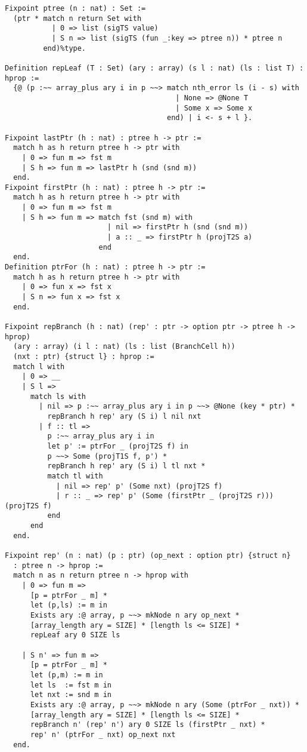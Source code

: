 \documentclass{article}
\begin{document}
\begin{lstlisting}
Fixpoint ptree (n : nat) : Set :=
  (ptr * match n return Set with
           | 0 => list (sigTS value)
           | S n => list (sigTS (fun _:key => ptree n)) * ptree n
         end)%type.

Definition repLeaf (T : Set) (ary : array) (s l : nat) (ls : list T) : hprop :=
  {@ (p :~~ array_plus ary i in p ~~> match nth_error ls (i - s) with
                                        | None => @None T
                                        | Some x => Some x
                                      end) | i <- s + l }.
  
Fixpoint lastPtr (h : nat) : ptree h -> ptr :=
  match h as h return ptree h -> ptr with
    | 0 => fun m => fst m
    | S h => fun m => lastPtr h (snd (snd m))
  end.
Fixpoint firstPtr (h : nat) : ptree h -> ptr :=
  match h as h return ptree h -> ptr with
    | 0 => fun m => fst m
    | S h => fun m => match fst (snd m) with
                        | nil => firstPtr h (snd (snd m))
                        | a :: _ => firstPtr h (projT2S a)
                      end
  end.
Definition ptrFor (h : nat) : ptree h -> ptr :=
  match h as h return ptree h -> ptr with
    | 0 => fun x => fst x
    | S n => fun x => fst x
  end.

Fixpoint repBranch (h : nat) (rep' : ptr -> option ptr -> ptree h -> hprop) 
  (ary : array) (i l : nat) (ls : list (BranchCell h))
  (nxt : ptr) {struct l} : hprop :=
  match l with
    | 0 => __
    | S l => 
      match ls with
        | nil => p :~~ array_plus ary i in p ~~> @None (key * ptr) * 
          repBranch h rep' ary (S i) l nil nxt
        | f :: tl =>
          p :~~ array_plus ary i in
          let p' := ptrFor _ (projT2S f) in
          p ~~> Some (projT1S f, p') *
          repBranch h rep' ary (S i) l tl nxt *
          match tl with
            | nil => rep' p' (Some nxt) (projT2S f)
            | r :: _ => rep' p' (Some (firstPtr _ (projT2S r))) (projT2S f)
          end
      end
  end.

Fixpoint rep' (n : nat) (p : ptr) (op_next : option ptr) {struct n}
  : ptree n -> hprop :=
  match n as n return ptree n -> hprop with 
    | 0 => fun m =>
      [p = ptrFor _ m] *
      let (p,ls) := m in
      Exists ary :@ array, p ~~> mkNode n ary op_next *
      [array_length ary = SIZE] * [length ls <= SIZE] *
      repLeaf ary 0 SIZE ls
        
    | S n' => fun m =>
      [p = ptrFor _ m] *
      let (p,m) := m in
      let ls  := fst m in
      let nxt := snd m in
      Exists ary :@ array, p ~~> mkNode n ary (Some (ptrFor _ nxt)) *
      [array_length ary = SIZE] * [length ls <= SIZE] *
      repBranch n' (rep' n') ary 0 SIZE ls (firstPtr _ nxt) *
      rep' n' (ptrFor _ nxt) op_next nxt
  end.
\end{lstlisting}
\end{document}
